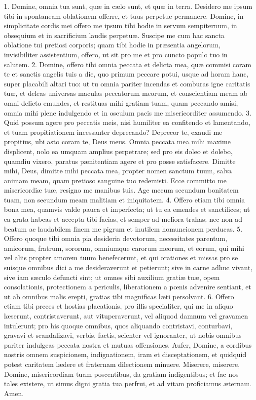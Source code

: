 \documentclass[twoside]{article}
\begin{document}
1. Domine, omnia tua sunt, quæ in cælo sunt, et quæ in terra. Desidero me ipsum tibi in spontaneam oblationem offerre, et tuus perpetue permanere. Domine, in simplicitate cordis mei offero me ipsum tibi hodie in servum sempiternum, in obsequium et in sacrificium laudis perpetuæ. Suscipe me cum hac sancta oblatione tui pretiosi corporis; quam tibi hodie in præsentia angelorum, invisibiliter assistentium, offero, ut sit pro me et pro cuncto populo tuo in salutem.
2. Domine, offero tibi omnia peccata et delicta mea, quæ commisi coram te et sanctis angelis tuis a die, quo primum peccare potui, usque ad horam hanc, super placabili altari tuo: ut tu omnia pariter incendas et comburas igne caritatis tuæ, et deleas universas maculas peccatorum meorum, et conscientiam meam ab omni delicto emundes, et restituas mihi gratiam tuam, quam peccando amisi, omnia mihi plene indulgendo et in osculum pacis me misericorditer assumendo.
3. Quid possum agere pro peccatis meis, nisi humiliter ea confitendo et lamentando, et tuam propitiationem incessanter deprecando? Deprecor te, exaudi me propitius, ubi asto coram te, Deus meus. Omnia peccata mea mihi maxime displicent, nolo ea umquam amplius perpetrare; sed pro eis doleo et dolebo, quamdiu vixero, paratus pænitentiam agere et pro posse satisfacere. Dimitte mihi, Deus, dimitte mihi peccata mea, propter nomen sanctum tuum, salva animam meam, quam pretioso sanguine tuo redemisti. Ecce committo me misericordiæ tuæ, resigno me manibus tuis. Age mecum secundum bonitatem tuam, non secundum meam malitiam et iniquitatem.
4. Offero etiam tibi omnia bona mea, quamvis valde pauca et imperfecta; ut tu ea emendes et sanctifices; ut ea grata habeas et accepta tibi facias, et semper ad meliora trahas; nec non ad beatum ac laudabilem finem me pigrum et inutilem homuncionem perducas.
5. Offero quoque tibi omnia pia desideria devotorum, necessitates parentum, amicorum, fratrum, sororum, omniumque carorum meorum, et eorum, qui mihi vel aliis propter amorem tuum benefecerunt, et qui orationes et missas pro se suisque omnibus dici a me desideraverunt et petierunt; sive in carne adhuc vivant, sive iam sæculo defuncti sint; ut omnes sibi auxilium gratiæ tuæ, opem consolationis, protectionem a periculis, liberationem a pœnis advenire sentiant, et ut ab omnibus malis erepti, gratias tibi magnificas læti persolvant.
6. Offero etiam tibi preces et hostias placationis, pro illis specialiter, qui me in aliquo læserunt, contristaverunt, aut vituperaverunt, vel aliquod damnum vel gravamen intulerunt; pro his quoque omnibus, quos aliquando contristavi, conturbavi, gravavi et scandalizavi, verbis, factis, scienter vel ignoranter, ut nobis omnibus pariter indulgeas peccata nostra et mutuas offensiones. Aufer, Domine, a cordibus nostris omnem suspicionem, indignationem, iram et disceptationem, et quidquid potest caritatem lædere et fraternam dilectionem minuere. Miserere, miserere, Domine, misericordiam tuam poscentibus, da gratiam indigentibus; et fac nos tales existere, ut simus digni gratia tua perfrui, et ad vitam proficiamus æternam. Amen.
\end{document}
